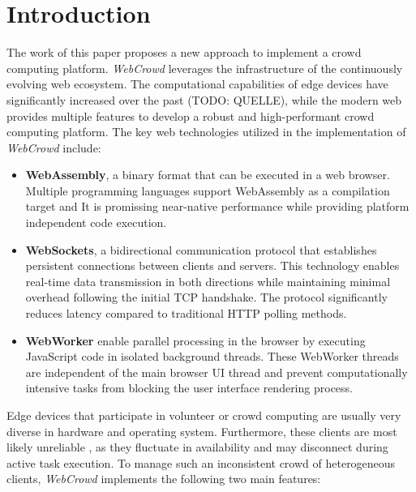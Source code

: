 \chapter{Introduction}
\label{ch:intro}
The work of this paper proposes a new approach to implement a crowd computing platform. \emph{WebCrowd} leverages the infrastructure of the continuously evolving web ecosystem. The computational capabilities of edge devices have significantly increased over the past (TODO: QUELLE), while the modern web provides multiple features to develop a robust and high-performant crowd computing platform. The key web technologies utilized in the implementation of \emph{WebCrowd} include:

\begin{itemize}
    \item \textbf{WebAssembly}, a binary format that can be executed in a web browser. Multiple programming languages support WebAssembly as a compilation target and It is promissing near-native performance while providing platform independent code execution.\cite{methodology:wasm}
    \item \textbf{WebSockets}, a bidirectional communication protocol that establishes persistent connections between clients and servers. This technology enables real-time data transmission in both directions while maintaining minimal overhead following the initial TCP handshake. The protocol significantly reduces latency compared to traditional HTTP polling methods. \cite{methodology:websockets3} 
    \item \textbf{WebWorker} enable parallel processing in the browser by executing JavaScript code in isolated background threads. These WebWorker threads are independent of the main browser UI thread and prevent computationally intensive tasks from blocking the user interface rendering process. \cite{methodology:webworkers}
\end{itemize}

Edge devices that participate in volunteer or crowd computing are usually very diverse in hardware and operating system. \cite{intro:diverseDevices} Furthermore, these clients are most likely unreliable \cite{relatedwork:boinc1}, as they fluctuate in availability and may disconnect during active task execution. To manage such an inconsistent crowd of heterogeneous clients, \emph{WebCrowd} implements the following two main features:

